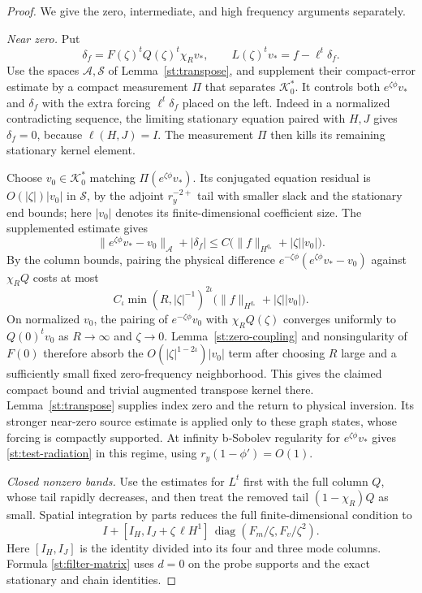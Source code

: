 \begin{proof}
We give the zero, intermediate, and high frequency arguments
separately.

\emph{Near zero.}
Put
\[
 \delta_f=F(\zeta)^tQ(\zeta)^t\chi_Rv_*,
 \qquad
 L(\zeta)^t v_*=f-\ell^t\delta_f.
\]
Use the spaces $\mathcal A,\mathcal S$ of
Lemma~\ref{st:transpose}, and supplement their compact-error
estimate by a compact measurement $\Pi$ that separates
$\mathcal K_0^*$.  It controls both
$e^{\zeta\phi}v_*$ and $\delta_f$ with the extra forcing
$\ell^t\delta_f$ placed on the left.  Indeed in a normalized
contradicting sequence, the limiting stationary equation paired
with $H,J$ gives $\delta_f=0$, because $\ell(H,J)=I$.
The measurement $\Pi$ then kills its remaining stationary
kernel element.

Choose $v_0\in\mathcal K_0^*$ matching
$\Pi(e^{\zeta\phi}v_*)$.  Its conjugated equation residual is
$O(|\zeta|)|v_0|$ in $\mathcal S$, by the adjoint
$r_y^{-2+}$ tail with smaller slack and the stationary end
bounds; here $|v_0|$ denotes its finite-dimensional coefficient
size.  The supplemented estimate gives
\begin{equation}\label{st:near-zero-comparison}
 \|e^{\zeta\phi}v_*-v_0\|_{\mathcal A}+|\delta_f|
 \leq C\bigl(\|f\|_{H^{q_*}}+|\zeta||v_0|\bigr).
\end{equation}
By the column bounds, pairing the physical difference
$e^{-\zeta\phi}(e^{\zeta\phi}v_*-v_0)$ against $\chi_RQ$
costs at most
\[
 C_\iota\min(R,|\zeta|^{-1})^{2\iota}
       \bigl(\|f\|_{H^{q_*}}+|\zeta||v_0|\bigr).
\]
On normalized $v_0$, the pairing of
$e^{-\zeta\phi}v_0$ with $\chi_RQ(\zeta)$ converges uniformly
to $Q(0)^t v_0$ as $R\to\infty$ and $\zeta\to0$.
Lemma~\ref{st:zero-coupling} and nonsingularity of $F(0)$
therefore absorb the
$O(|\zeta|^{1-2\iota})|v_0|$ term after choosing $R$ large
and a sufficiently small fixed zero-frequency neighborhood.
This gives the claimed compact bound and trivial augmented
transpose kernel there.  Lemma~\ref{st:transpose} supplies
index zero and the return to physical inversion.  Its stronger
near-zero source estimate is applied only to these graph
states, whose forcing is compactly supported.
At infinity b-Sobolev regularity for $e^{\zeta\phi}v_*$
gives \eqref{st:test-radiation} in this regime, using
$r_y(1-\phi')=O(1)$.

\emph{Closed nonzero bands.}
Use the estimates for $L^t$ first with the full column $Q$,
whose tail rapidly decreases, and then treat the removed
tail $(1-\chi_R)Q$ as small.  Spatial integration by parts
reduces the full finite-dimensional condition to
\begin{equation}\label{st:filter-matrix}
 I+[I_H,I_J+\zeta\,\ell H^1]\,
       \operatorname{diag}(F_m/\zeta,F_v/\zeta^2).
\end{equation}
Here $[I_H,I_J]$ is the identity divided into its four and
three mode columns.  Formula \eqref{st:filter-matrix}
uses $d=0$ on the probe supports and the exact stationary
and chain identities.


\end{proof}
